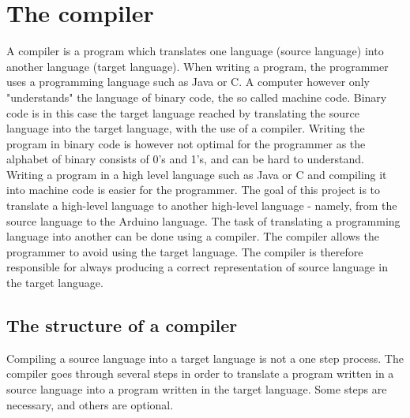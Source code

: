 \chapter{The compiler} \label{chap:the_compiler}
A compiler is a program which translates one language (source language) into another language (target language). When writing a program, the programmer uses a programming language such as Java or C. A computer however only "understands" the language of binary code, the so called machine code. Binary code is in this case the target language reached by translating the source language into the target language, with the use of a compiler. Writing the program in binary code is however not optimal for the programmer as the alphabet of binary consists of 0's and 1's, and can be hard to understand. Writing a program in a high level language such as Java or C and compiling it into machine code is easier for the programmer.
The goal of this project is to translate a high-level language to another high-level language - namely, from the source language to the Arduino language. The task of translating a programming language into another can be done using a compiler. The compiler allows the programmer to avoid using the target language. The compiler is therefore responsible for always producing a correct representation of source language in the target language.

\section{The structure of a compiler} 
\label{sec:compiler}
Compiling a source language into a target language is not a one step process. The compiler goes through several steps in order to translate a program written in a source language into a program written in the target language. Some steps are necessary, and others are optional.

